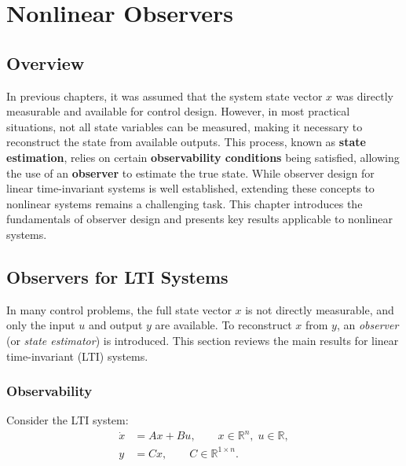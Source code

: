 \chapterspaceabove{6.75cm} %
\chapterspacebelow{7.25cm} %

\chapter{Nonlinear Observers}
\section{Overview}
In previous chapters, it was assumed that the system state vector $x$ was directly measurable and available for control design. However, in most practical situations, not all state variables can be measured, making it necessary to reconstruct the state from available outputs. This process, known as \textbf{state estimation}, relies on certain \textbf{observability conditions} being satisfied, allowing the use of an \textbf{observer} to estimate the true state. While observer design for linear time-invariant systems is well established, extending these concepts to nonlinear systems remains a challenging task. This chapter introduces the fundamentals of observer design and presents key results applicable to nonlinear systems.

\section{Observers for LTI Systems}

In many control problems, the full state vector $x$ is not directly measurable, 
and only the input $u$ and output $y$ are available. 
To reconstruct $x$ from $y$, an \emph{observer} (or \emph{state estimator}) 
is introduced. This section reviews the main results for linear time-invariant (LTI) systems.

\subsection{Observability}

Consider the LTI system:
\begin{align}
    \dot{x} &= A x + B u, \qquad x \in \mathbb{R}^n, \; u \in \mathbb{R}, \label{eq:lti_sys}\\
    y &= C x, \qquad C \in \mathbb{R}^{1\times n}. \label{eq:lti_out}
\end{align}

